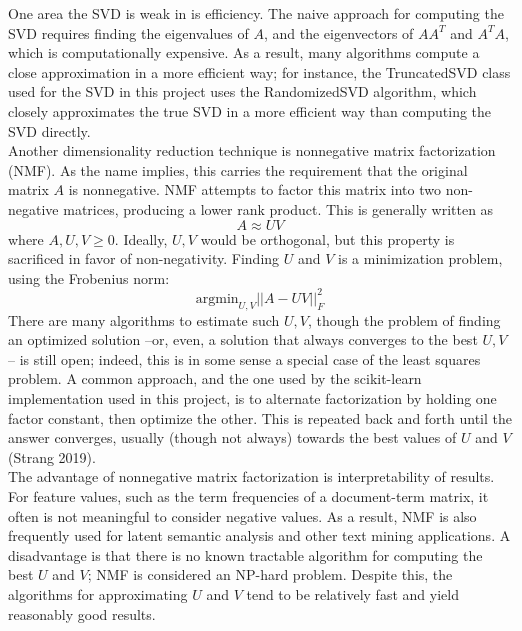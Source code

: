 \documentclass{article}
\begin{document}
One area the SVD is weak in is efficiency. The naive approach for computing the SVD requires finding the eigenvalues of $A$, and the eigenvectors of $AA^T$ and $A^TA$, which is computationally expensive. As a result, many algorithms compute a close approximation in a more efficient way; for instance, the TruncatedSVD class used for the SVD in this project uses the RandomizedSVD algorithm, which closely approximates the true SVD in a more efficient way than computing the SVD directly.
\\

Another dimensionality reduction technique is nonnegative matrix factorization (NMF). As the name implies, this carries the requirement that the original matrix $A$ is nonnegative.  NMF attempts to factor this matrix into two non-negative matrices, producing a lower rank product. This is generally written as
$$A \approx UV$$
where $A, U, V \ge 0$. Ideally, $U,V$ would be orthogonal, but this property is sacrificed in favor of non-negativity. Finding $U$ and $V$ is a minimization problem, using the Frobenius norm:
$$\textrm{argmin}_{U, V}||A - UV||^2_F$$
There are many algorithms to estimate such $U, V$, though the problem of finding an optimized solution --or, even, a solution that always converges to the best $U, V$-- is still open; indeed, this is in some sense a special case of the least squares problem. A common approach, and the one used by the scikit-learn implementation used in this project, is to alternate factorization by holding one factor constant, then optimize the other. This is repeated back and forth until the answer converges, usually (though not always) towards the best values of $U$ and $V$ (Strang 2019). \\

The advantage of nonnegative matrix factorization is interpretability of results. For feature values, such as the term frequencies of a document-term matrix, it often is not meaningful to consider negative values. As a result, NMF is also frequently used for latent semantic analysis and other text mining applications. A disadvantage is that there is no known tractable algorithm for computing the best $U$ and $V$; NMF is considered an NP-hard problem. Despite this, the algorithms for approximating $U$ and $V$ tend to be relatively fast and yield reasonably good results. 
\\
\end{document}
